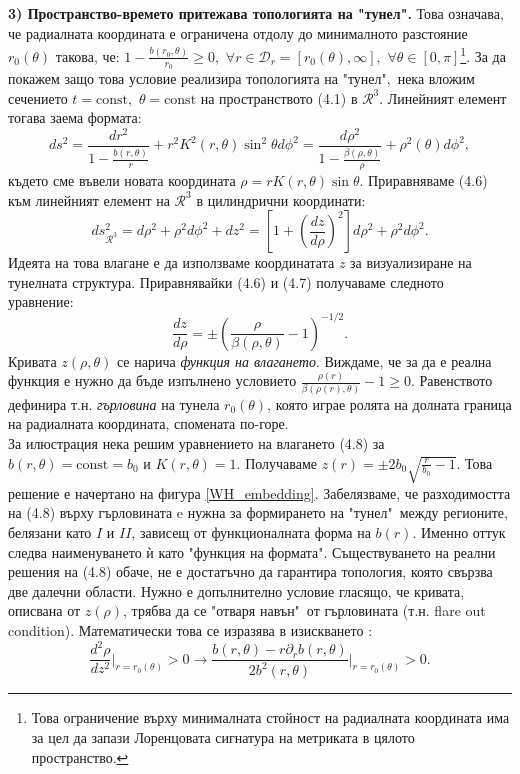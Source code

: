 \noindent\textbf{3) Пространство-времето притежава топологията на "тунел".} Това означава, че радиалната координата е ограничена отдолу до минималното разстояние $r_0(\theta)$ такова, че: $1 - \frac{b(r_0,\theta)}{r_0} \ge 0 ,\,\,\forall r\in \mathcal{D}_r = [r_0(\theta),\infty],\,\,\forall\theta\in[0,\pi]$\footnote{Това ограничение върху минималната стойност на радиалната координата има за цел да запази Лоренцовата сигнатура на метриката в цялото пространство.}. За да покажем защо това условие реализира топологията на "тунел"$,$ нека вложим сечението $t = \text{const},\,\,\theta = \text{const}$ на пространството (4.1) в $\mathcal{R}^3$. Линейният елемент тогава заема формата:
\begin{equation}
	ds^2 = \frac{dr^2}{1 - \frac{b(r,\theta)}{r}} + r^2K^2(r,\theta)\sin^2\theta d\phi^2 = \frac{d\rho^2}{1 - \frac{\beta(\rho,\theta)}{\rho}} + \rho^2(\theta)d\phi^2,
\end{equation}
където сме въвели новата координата $\rho = rK(r,\theta)\sin\theta$. Приравняваме (4.6) към линейният елемент на $\mathcal{R}^3$ в цилиндрични координати:
\begin{equation}
	ds^2_{\mathcal{R}^3} = d\rho^2 + \rho^2d\phi^2 + dz^2 = \left[1 + \left(\frac{dz}{d\rho}\right)^2\right]d\rho^2 + \rho^2d\phi^2.
\end{equation}
Идеята на това влагане е да използваме координатата $z$ за визуализиране на тунелната структура. Приравнявайки (4.6) и (4.7) получаваме следното уравнение:
\begin{equation}
	\frac{dz}{d\rho} = \pm \left(\frac{\rho}{\beta(\rho,\theta)} - 1\right)^{-1/2}.
\end{equation}
Кривата $z(\rho,\theta)$ се нарича \emph{функция на влагането}. Виждаме, че за да е реална функция е нужно да бъде изпълнено условието $\frac{\rho(r)}{\beta(\rho(r),\theta)}-1\ge 0$. Равенството дефинира т.н. \emph{гърловина} на тунела $r_0(\theta)$, която играе ролята на долната граница на радиалната координата, спомената по-горе.\\

\noindent За илюстрация нека решим уравнението на влагането (4.8) за $b(r,\theta) = \text{const} = b_0$ и $K(r,\theta) = 1$. Получаваме $z(r) = \pm 2b_0\sqrt{\frac{r}{b_0} - 1}$. Това решение е начертано на фигура \ref{WH_embedding}. Забелязваме, че разходимостта на (4.8) върху гърловината e нужна за формирането на "тунел"$\,$ между регионите, белязани като $I$ и $II$, зависещ от функционалната форма на $b(r)$. Именно оттук следва наименуването ѝ като "функция на формата". Съществуването на реални решения на (4.8) обаче, не е достатъчно да гарантира топология, която свързва две далечни области. Нужно е допълнително условие гласящо, че кривата, описвана от $z(\rho)$, трябва да се "отваря навън"$\,$ от гърловината (т.н. flare out condition). Математически това се изразява в изискването \cite{Teo}:
\begin{equation}
	\frac{d^2\rho}{dz^2}\bigg\vert_{r = r_0(\theta)} > 0\rightarrow \frac{b(r,\theta) - r\partial_rb(r,\theta)}{2b^2(r,\theta)}\bigg\vert_{r = r_0(\theta)} > 0.
\end{equation}\newline

